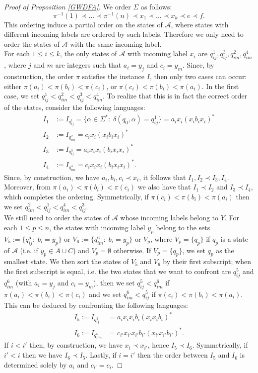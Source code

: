 \documentclass[runningheads]{llncs}
\begin{document}
\begin{proof}[\noindent Proof of Proposition \ref{GWDFA}]
We order $\Sigma$ as follows: \[
\pi^{-1}(1)\prec...\prec\pi^{-1}(n)\prec x_1\prec\dots\prec x_k\prec e\prec f.
\]
This ordering induce a partial order on the states of $\mathcal A$, where states with different incoming labels are ordered by such labels. Therefore we only need to order the states of $\mathcal A$ with the same incoming label. \\For each $1\le i\le k$, the only states of $\mathcal A$ with incoming label $x_i$ are $q_{ij}^1,q_{ij}^3,q_{im}^2,q_{im}^4$, where $j$ and $m$ are integers such that $a_i=y_j$ and $c_i=y_m$. Since, by construction, the order $\pi$ satisfies the instance $I$, then only two cases can occur: either $\pi(a_i)<\pi(b_i)<\pi(c_i)$, or $\pi(c_i)<\pi(b_i)<\pi(a_i)$. In the first case, we set $q_{ij}^1<q_{im}^2<q_{ij}^3<q_{im}^4$. To realize that this is in fact the correct order of the states, consider the following languages:
\begin{align*}
    I_1&:=I_{q_{ij}^1}=\{\alpha\in\Sigma^*:\;\delta(q_0,\alpha)=q_{ij}^1\}=a_ix_i(x_ib_ix_i)^*\\
    I_2&:=I_{q_{im}^2}=c_ix_i(x_ib_ix_i)^*\\
    I_3&:=I_{q_{ij}^3}=a_ix_ix_i(b_ix_ix_i)^*\\
    I_4&:=I_{q_{im}^4}=c_ix_ix_i(b_ix_ix_i)^*.
\end{align*}
Since, by construction, we have $a_i,b_i,c_i\prec x_i$, it follows that $I_1,I_2\prec I_3,I_4$. Moreover, from $\pi(a_i)< \pi(b_i)< \pi(c_i)$ we also have that $I_1\prec I_2$ and $I_3\prec I_4$, which completes the ordering. Symmetrically, if $\pi(c_i)<\pi(b_i)<\pi(a_i)$ then we set $q_{im}^2<q_{ij}^1<q_{im}^4<q_{ij}^3$. \\
We still need to order the states of $\mathcal A$ whose incoming labels belong to $Y$. For each $1\le p\le n$, the states with incoming label $y_p$ belong to the sets $V_5:=\{q_{ij}^5:\;b_i=y_p\}$ or $V_6:=\{q_{im}^6:\;b_i=y_p\}$ or $V_p$, where $V_p=\{q_p\}$ if $q_p$ is a state of $\mathcal A$ (i.e. if $y_p\in A\cup C$) and $V_p=\emptyset$ otherwise. If $V_p=\{q_p\}$, we set $q_p$ as the smallest state. We then sort the states of $V_5$ and $V_6$ by their first subscript; when the first subscript is equal, i.e. the two states that we want to confront are $q_{ij}^5$ and $q_{im}^6$ (with $a_i=y_j$ and $c_i=y_m$), then we set $q_{ij}^5<q_{im}^6$ if $\pi(a_i)< \pi(b_i)<\pi(c_i)$ and we set $q_{im}^6<q_{ij}^5$ if $\pi(c_i)<\pi(b_i)<\pi(a_i)$. This can be deduced by confronting the following languages:
\begin{align*}
    I_5:=I_{q_{ij}^5}&=a_ix_ix_ib_i(x_ix_ib_i)^*\\
    I_6:=I_{q_{i'm}^6}&=c_{i'}x_{i'}x_{i'}b_{i'}(x_{i'}x_{i'}b_{i'})^*.
\end{align*}
If $i< i'$ then, by construction, we have $x_i\prec x_{i'}$, hence $I_5\prec I_6$. Symmetrically, if $i'<i$ then we have $I_6\prec I_5$. Lastly, if $i=i'$ then the order between $I_5$ and $I_6$ is determined solely by $a_i$ and $c_{i'}=c_i$. 


\end{proof}
\end{document}
